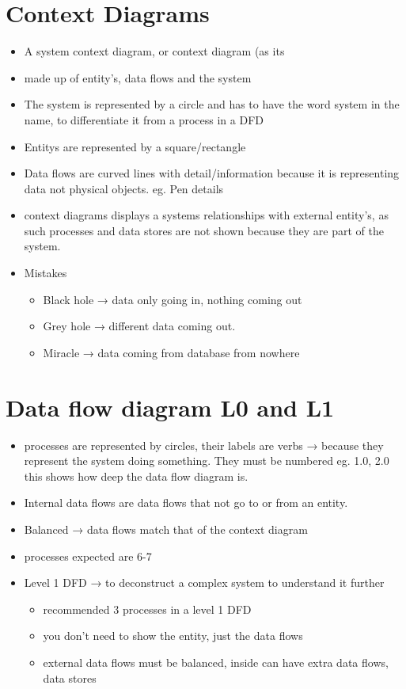 \documentclass[12pt, a4, twoside]{article}
\begin{document}
  \section{Context Diagrams}
  \begin{itemize}
    \item A system context diagram, or context diagram (as its
    \item made up of entity's, data flows and the system
    \item The system is represented by a circle and has to have the word system in the name, to differentiate it from a process in a DFD
    \item Entitys are represented by a square/rectangle
    \item Data flows are curved lines with detail/information because it is representing data not physical objects. eg. Pen details
    \item context diagrams displays a systems relationships with external entity’s, as such processes and data stores are not shown because they are part of the system.
    \item Mistakes
    \begin{itemize}
      \item Black hole → data only going in, nothing coming out
      \item Grey hole → different data coming out.
      \item Miracle → data coming from database from nowhere
    \end{itemize}
  \end{itemize}

  \section{Data flow diagram L0 and L1}
  \begin{itemize}
    \item processes are represented by circles, their labels are verbs → because they represent the system doing something. They must be numbered eg. 1.0, 2.0 this shows how deep the data flow diagram is.
    \item Internal data flows are data flows that not go to or from an entity.
    \item Balanced → data flows match that of the context diagram
    \item processes expected are 6-7
    \item Level 1 DFD → to deconstruct a complex system to understand it further
    \begin{itemize}
      \item recommended 3 processes in a level 1 DFD
      \item you don’t need to show the entity, just the data flows
      \item external data flows must be balanced, inside can have extra data flows, data stores
    \end{itemize}
  \end{itemize}
\end{document}
